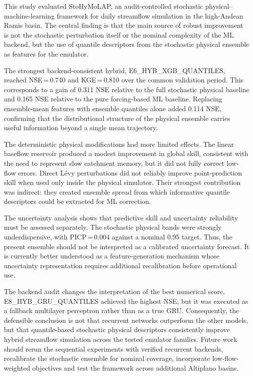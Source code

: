 This study evaluated StoHyMoLAP, an audit-controlled stochastic
physical--machine-learning framework for daily streamflow simulation in
the high-Andean Ramis basin. The central finding is that the main source
of robust improvement is not the stochastic perturbation itself or the
nominal complexity of the ML backend, but the use of quantile
descriptors from the stochastic physical ensemble as features for the
emulator.

The strongest backend-consistent hybrid, E6\_HYB\_XGB\_QUANTILES,
reached NSE\,=\,0.740 and KGE\,=\,0.810 over the common validation
period. This corresponds to a gain of 0.311 NSE relative to the full
stochastic physical baseline and 0.165 NSE relative to the pure
forcing-based ML baseline. Replacing ensemble-mean features with
ensemble quantiles alone added 0.114 NSE, confirming that the
distributional structure of the physical ensemble carries useful
information beyond a single mean trajectory.

The deterministic physical modifications had more limited effects. The
linear baseflow reservoir produced a modest improvement in global skill,
consistent with the need to represent slow catchment memory, but it did
not fully correct low-flow errors. Direct L\'{e}vy perturbations did not
reliably improve point-prediction skill when used only inside the
physical simulator. Their strongest contribution was indirect: they
created ensemble spread from which informative quantile descriptors
could be extracted for ML correction.

The uncertainty analysis shows that predictive skill and uncertainty
reliability must be assessed separately. The stochastic physical bands
were strongly underdispersive, with PICP\,=\,0.004 against a nominal
0.95 target. Thus, the present ensemble should not be interpreted as a
calibrated uncertainty forecast. It is currently better understood as a
feature-generation mechanism whose uncertainty representation requires
additional recalibration before operational use.

The backend audit changes the interpretation of the best numerical
score. E8\_HYB\_GRU\_QUANTILES achieved the highest NSE, but it was
executed as a fallback multilayer perceptron rather than as a true GRU.
Consequently, the defensible conclusion is not that recurrent networks
outperform the other models, but that quantile-based stochastic
physical descriptors consistently improve hybrid streamflow simulation
across the tested emulator families. Future work should rerun the
sequential experiments with verified recurrent backends, recalibrate the
stochastic ensemble for nominal coverage, incorporate low-flow-weighted
objectives and test the framework across additional Altiplano basins.

